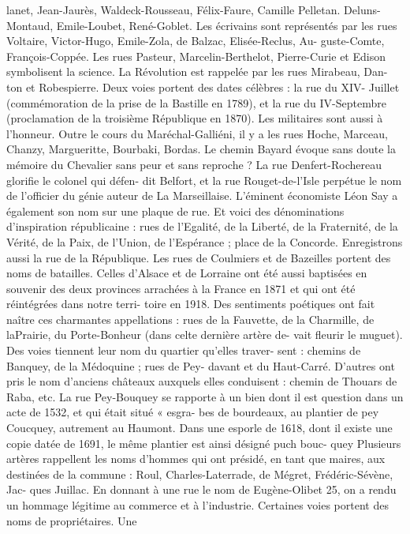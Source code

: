 \documentclass[a4paper,11pt]{book}
\begin{document}
lanet, Jean-Jaurès, Waldeck-Rousseau, Félix-Faure, Camille
Pelletan. Deluns-Montaud, Emile-Loubet, René-Goblet.
Les écrivains sont représentés par les rues Voltaire,
Victor-Hugo, Emile-Zola, de Balzac, Elisée-Reclus, Au-
guste-Comte, François-Coppée.
Les rues Pasteur, Marcelin-Berthelot, Pierre-Curie et
Edison symbolisent la science.
La Révolution est rappelée par les rues Mirabeau, Dan-
ton et Robespierre.
Deux voies portent des dates célèbres : la rue du XIV-
Juillet (commémoration de la prise de la Bastille en 1789),
et la rue du IV-Septembre (proclamation de la troisième
République en 1870).
Les militaires sont aussi à l'honneur. Outre le cours du
Maréchal-Galliéni, il y a les rues Hoche, Marceau, Chanzy,
Margueritte, Bourbaki, Bordas.
Le chemin Bayard évoque sans doute la mémoire du
Chevalier sans peur et sans reproche ?
La rue Denfert-Rochereau glorifie le colonel qui défen-
dit Belfort, et la rue Rouget-de-l'Isle perpétue le nom de
l'officier du génie auteur de La Marseillaise.
L'éminent économiste Léon Say a également son nom
sur une plaque de rue.
Et voici des dénominations d'inspiration républicaine :
rues de l'Egalité, de la Liberté, de la Fraternité, de la
Vérité, de la Paix, de l'Union, de l'Espérance ; place de la
Concorde. Enregistrons aussi la rue de la République.
Les rues de Coulmiers et de Bazeilles portent des noms
de batailles. Celles d'Alsace et de Lorraine ont été aussi
baptisées en souvenir des deux provinces arrachées à la
France en 1871 et qui ont été réintégrées dans notre terri-
toire en 1918.
Des sentiments poétiques ont fait naître ces charmantes
appellations : rues de la Fauvette, de la Charmille, de laPrairie, du Porte-Bonheur (dans celte dernière artère de-
vait fleurir le muguet).
Des voies tiennent leur nom du quartier qu'elles traver-
sent : chemins de Banquey, de la Médoquine ; rues de Pey-
davant et du Haut-Carré. D'autres ont pris le nom d'anciens
châteaux auxquels elles conduisent : chemin de Thouars
de Raba, etc.
La rue Pey-Bouquey se rapporte à un bien dont il est
question dans un acte de 1532, et qui était situé « esgra-
bes de bourdeaux, au plantier de pey Coucquey, autrement
au Haumont.
Dans une esporle de 1618, dont il existe une copie datée
de 1691, le même plantier est ainsi désigné puch bouc-
quey
Plusieurs artères rappellent les noms d'hommes qui ont
présidé, en tant que maires, aux destinées de la commune :
Roul, Charles-Laterrade, de Mégret, Frédéric-Sévène, Jac-
ques Juillac.
En donnant à une rue le nom de Eugène-Olibet 25, on
a rendu un hommage légitime au commerce et à l'industrie.
Certaines voies portent des noms de propriétaires. Une
\end{document}
